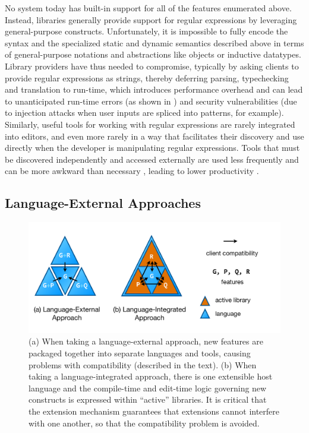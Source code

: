 No system today has built-in support for all of the features enumerated above. Instead, libraries generally provide support for regular expressions by leveraging  general-purpose constructs. Unfortunately, it is impossible to fully encode the syntax and the specialized static and dynamic semantics described above in terms of general-purpose notations and abstractions like objects or inductive datatypes. Library providers have thus needed to compromise, typically by asking clients to provide regular expressions as strings, thereby deferring parsing, typechecking and translation to run-time, which introduces performance overhead and can lead to unanticipated run-time errors (as shown in \cite{spishak2012type}) and security vulnerabilities (due to injection attacks when user inputs are spliced into patterns, for example). Similarly, useful tools for working with regular expressions are rarely integrated into editors, and even more rarely in a way that facilitates their discovery and use directly when the developer is manipulating regular expressions. Tools that must be discovered independently and accessed externally are used less frequently  and can be more awkward than necessary \cite{Campbell:2008:DRT:1636642.1636651, Omar:2012:ACC:2337223.2337324}, leading to lower productivity \cite{Omar:2012:ACC:2337223.2337324}.

\subsection{Language-External Approaches}
\begin{figure}
\begin{center}
\includegraphics[scale=.48]{approaches.pdf}
\end{center}
\vspace{-20px}
\caption{\small (a) When taking a language-external approach, new features are packaged together into separate languages and tools, causing problems with compatibility (described in the text). (b) When taking a language-integrated approach, there is one extensible host language and the compile-time and edit-time logic governing new constructs is expressed within ``active'' libraries. It is critical that the extension mechanism  guarantees that extensions cannot interfere with one another, so that the compatibility problem is avoided.}
\label{approaches}
\end{figure}

